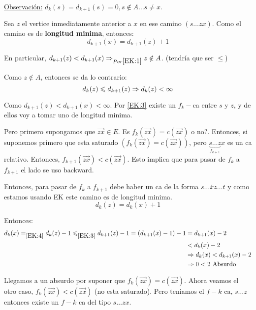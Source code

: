 \documentclass[12pt,a4paper]{article}
\begin{document}
\underline{Observación:} $d_{k}(s) = d_{k+1}(s) = 0, s\notin A \ldots s \neq x$.
\medskip

Sea $z$ el vertice inmediatamente anterior a $x$ en ese camino $(s\ldots zx)$. 
Como el camino es de \textbf{longitud minima}, entonces:
\begin{equation}
    d_{k+1}(x) = d_{k+1}(z) + 1
    \label{EK:2}
\end{equation}

En particular, $d_{k+1}(z) < d_{k+1}(x) \Rightarrow_{Por \eqref{EK:1}} z \notin A$. 
(tendría que ser $\leq$)
\medskip

Como $z \notin A$, entonces se da lo contrario:
\begin{equation}
    d_{k}(z) \leqslant d_{k+1}(z) \Rightarrow d_{k}(z) < \infty
    \label{EK:3}
\end{equation}

Como $d_{k+1}(z) < d_{k+1}(x) < \infty$. Por \eqref{EK:3} existe un $f_{k}-$ca 
entre $s$ y $z$, y de ellos voy a tomar uno de longitud minima.
\medskip

Pero primero supongamos que $\overrightarrow{zx} \in E$. Es $f_{k}(\overrightarrow{zx}) = c(\overrightarrow{zx})$ o no?.
Entonces, si suponemos primero que esta saturado $(f_{k}(\overrightarrow{zx}) = c(\overrightarrow{zx}))$, 
pero $\underbrace{s\ldots z}_{f_{k+1}}x$ es un ca relativo. Entonces, $f_{k+1}(\overrightarrow{zx}) < c(\overrightarrow{zx})$.
Esto implica que para pasar de $f_{k}$ a $f_{k+1}$ el lado se uso backward.
\medskip

Entonces, para pasar de $f_{k}$ a $f_{k+1}$ debe haber un ca de la forma 
$s \ldots \overleftarrow{xz} \ldots t$ y como estamos usando EK este camino es de 
longitud minima.
\begin{equation}
    d_{k}(z) = d_{k}(x) + 1
    \label{EK:4}
\end{equation}

Entonces:
\begin{align*}
    d_{k}(x) =_{\eqref{EK:4}} d_{k}(z)-1 \leqslant _{\eqref{EK:3}} d_{k+1}(z) -1 = (d_{k+1}(x)-1)-1 &= d_{k+1}(x) -2\\
    &<d_{k}(x) -2\\
    &\Rightarrow d_{k}(x) < d_{k+1}(x)-2 \\
    &\Rightarrow 0 < 2 \,\,\text{Absurdo}
\end{align*}

Llegamos a un absurdo por suponer que $f_{k}(\overrightarrow{zx}) = c(\overrightarrow{zx})$. 
Ahora veamos el otro caso, $f_{k}(\overrightarrow{zx}) < c(\overrightarrow{zx})$ (no esta saturado).
Pero teniamos el $f-k$ ca, $s \ldots z$ entonces existe un $f-k$ ca del tipo $s\ldots zx$.
\medskip
\end{document}
